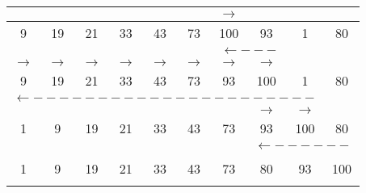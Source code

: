 \documentclass[a4paper, 9pt]{article}
\begin{document}
\begin{center}
\begin{tabular}{|c|c|c|c|c|c|c|c|c|c|}
          
          \multicolumn{6}{c}{} & \multicolumn{1}{c}{$ \rightarrow $} & \multicolumn{3}{c}{}\\ \hline
          \rowcolor{green!70} 9 & 19 & 21 & 33 & 43 & 73 & 100 & \rowcolor{red!70} 93 & 1 & 80 \\ \hline
          \multicolumn{6}{c}{} & \multicolumn{2}{c}{$ \leftarrow --- $} &  \multicolumn{2}{c}{}\\
          
          
          \multicolumn{1}{c}{$ \rightarrow $} & \multicolumn{1}{c}{$ \rightarrow $} & \multicolumn{1}{c}{$ \rightarrow $} & \multicolumn{1}{c}{$ \rightarrow $} & \multicolumn{1}{c}{$ \rightarrow $} & \multicolumn{1}{c}{$ \rightarrow $} & \multicolumn{1}{c}{$ \rightarrow $} & \multicolumn{1}{c}{$ \rightarrow $} & \multicolumn{2}{c}{}\\ \hline
          \rowcolor{green!70} 9 & 19 & 21 & 33 & 43 & 73 & 93 & 100 & \rowcolor{red!70} 1 & 80 \\ \hline
          \multicolumn{9}{c}{$ \leftarrow ---------------------- $} &  \multicolumn{1}{c}{}\\
          
          
          \multicolumn{7}{c}{} & \multicolumn{1}{c}{$ \rightarrow $} & \multicolumn{1}{c}{$ \rightarrow $} & \multicolumn{1}{c}{}\\ \hline
          \rowcolor{green!70} 1 & 9 & 19 & 21 & 33 & 43 & 73 & 93 & 100 & \rowcolor{red!70} 80 \\ \hline
          \multicolumn{7}{c}{} & \multicolumn{3}{c}{$ \leftarrow ------ $}\\
          
          
          \multicolumn{10}{c}{}\\ \hline
          \rowcolor{green!70} 1 & 9 & 19 & 21 & 33 & 43 & 73 & 80 & 93 & 100\\ \hline
          \multicolumn{10}{c}{}\\
          
        \end{tabular}
    \end{center}
\end{document}
